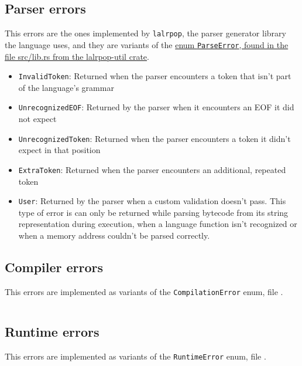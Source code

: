 \documentclass[11pt]{scrreprt}
\begin{document}
\subsection{Parser errors}
This errors are the ones implemented by \texttt{lalrpop}, the parser generator library the language uses, and they are variants of the \href{https://github.com/lalrpop/lalrpop/blob/fc9986c725d908a60b11d8480711afa33f7f3564/lalrpop-util/src/lib.rs#L15}{enum \texttt{ParseError}, found in the file src/lib.rs from the lalrpop-util crate}.
\begin{itemize}
  \item \texttt{InvalidToken}: Returned when the parser encounters a token that isn't part of the language's grammar
  \item \texttt{UnrecognizedEOF}: Returned by the parser when it encounters an EOF it did not expect
  \item \texttt{UnrecognizedToken}: Returned when the parser encounters a token it didn't expect in that position
  \item \texttt{ExtraToken}: Returned when the parser encounters an additional, repeated token
  \item \texttt{User}: Returned by the parser when a custom validation doesn't pass. This type of error is can only be returned while parsing bytecode from its string representation during execution, when a language function isn't recognized or when a memory address couldn't be parsed correctly.
\end{itemize}

\pagebreak
\subsection{Compiler errors}
This errors are implemented as variants of the \texttt{CompilationError} enum, file .

\inputminted[firstline=9,lastline=35]{rust}{/home/mario/git/MarioJim/miniclj/miniclj-lib/src/compiler/error.rs}

\subsection{Runtime errors}
This errors are implemented as variants of the \texttt{RuntimeError} enum, file .

\inputminted[firstline=5,lastline=45]{rust}{/home/mario/git/MarioJim/miniclj/miniclj-lib/src/vm/error.rs}
\end{document}
